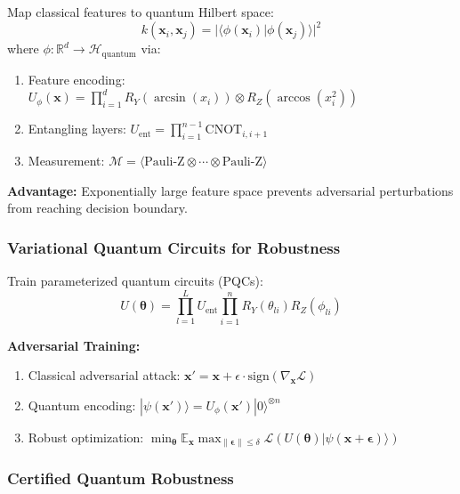 \documentclass[11pt,letterpaper]{article}
\begin{document}
Map classical features to quantum Hilbert space:
\begin{equation}
k(\mathbf{x}_i, \mathbf{x}_j) = |\langle \phi(\mathbf{x}_i) | \phi(\mathbf{x}_j) \rangle|^2
\end{equation}
where $\phi: \mathbb{R}^d \rightarrow \mathcal{H}_{\text{quantum}}$ via:
\begin{enumerate}
\item Feature encoding: $U_{\phi}(\mathbf{x}) = \prod_{i=1}^d R_Y(\arcsin(x_i)) \otimes R_Z(\arccos(x_i^2))$
\item Entangling layers: $U_{\text{ent}} = \prod_{i=1}^{n-1} \text{CNOT}_{i,i+1}$
\item Measurement: $\mathcal{M} = \langle \text{Pauli-Z} \otimes \cdots \otimes \text{Pauli-Z} \rangle$
\end{enumerate}

\textbf{Advantage:} Exponentially large feature space prevents adversarial perturbations from reaching decision boundary.

\subsubsection{Variational Quantum Circuits for Robustness}

Train parameterized quantum circuits (PQCs):
\begin{equation}
U(\boldsymbol{\theta}) = \prod_{l=1}^L U_{\text{ent}} \prod_{i=1}^n R_Y(\theta_{li}) R_Z(\phi_{li})
\end{equation}

\textbf{Adversarial Training:}
\begin{enumerate}
\item Classical adversarial attack: $\mathbf{x}' = \mathbf{x} + \epsilon \cdot \text{sign}(\nabla_{\mathbf{x}} \mathcal{L})$
\item Quantum encoding: $|\psi(\mathbf{x}')\rangle = U_{\phi}(\mathbf{x}') |0\rangle^{\otimes n}$
\item Robust optimization: $\min_{\boldsymbol{\theta}} \mathbb{E}_{\mathbf{x}} \max_{\|\boldsymbol{\epsilon}\| \leq \delta} \mathcal{L}(U(\boldsymbol{\theta})|\psi(\mathbf{x} + \boldsymbol{\epsilon})\rangle)$
\end{enumerate}

\subsubsection{Certified Quantum Robustness}
\end{document}
